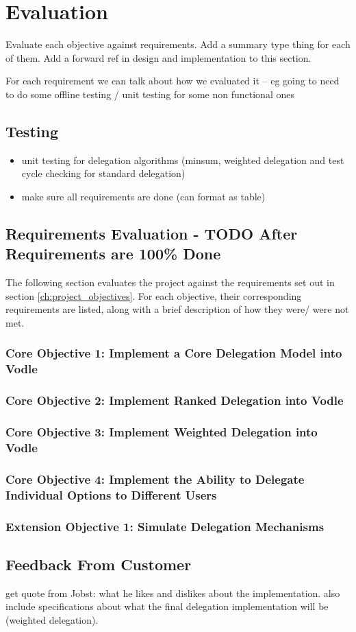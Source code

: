 \chapter{Evaluation}\label{ch:evaluation}


Evaluate each objective against requirements. Add a summary type thing for each of them.
Add a forward ref in design and implementation to this section.

For each requirement we can talk about how we evaluated it -- eg going to need to do some offline testing / unit testing for some non functional ones


\section{Testing}
\begin{itemize}
    \item unit testing for delegation algorithms (minsum, weighted delegation and test cycle checking for standard delegation)
    \item make sure all requirements are done (can format as table)
\end{itemize}
\section{Requirements Evaluation - TODO After Requirements are 100\% Done}
The following section evaluates the project against the requirements set out in section \ref{ch:project_objectives}. For each objective, their corresponding requirements are listed, along with a brief description of how they were/ were not met.

\subsection{Core Objective 1: Implement a Core Delegation Model into Vodle}
\subsection{Core Objective 2: Implement Ranked Delegation into Vodle}
\subsection{Core Objective 3: Implement Weighted Delegation into Vodle}
\subsection{Core Objective 4: Implement the Ability to Delegate Individual Options to Different Users}
\subsection{Extension Objective 1: Simulate Delegation Mechanisms}

\section{Feedback From Customer}
get quote from Jobst: what he likes and dislikes about the implementation. also include specifications about what the final delegation implementation will be (weighted delegation).